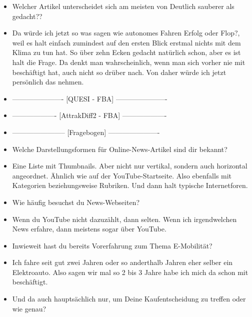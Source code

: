 {\begin{itemize}[]
              Deswegen würde ich da drauf gehen, auch wenn das jetzt eventuell vom Namen her eher das Gegenteil ist.
              Aber meiner Meinung nach hängt das natürlich trotzdem zusammen und würde mir halt sowohl auf positive als auch negative Art und Weise Informationen geben zu dem Thema.
              Der Artikel \flqq Von wegen nur das Klima retten\frqq{}.
        \item {} Welcher Artikel unterscheidet sich am meisten von \flqq Deutlich sauberer als gedacht?\frqq{}?
        \item {} Da würde ich jetzt so was sagen wie \flqq autonomes Fahren Erfolg oder Flop?\frqq{}, weil es halt einfach zumindest auf den ersten Blick erstmal nichts mit dem Klima zu tun hat.
              So über zehn Ecken gedacht natürlich schon, aber es ist halt die Frage.
              Da denkt man wahrscheinlich, wenn man sich vorher nie mit beschäftigt hat, auch nicht so drüber nach.
              Von daher würde ich jetzt persönlich das nehmen.
        \item {----------------------} [QUESI - FBA] {----------------------}
        \item {-------------------} [AttrakDiff2 - FBA] {-------------------}
        \item {-----------------------} [Fragebogen] {----------------------}
        \item {} Welche Darstellungsformen für Online-News-Artikel sind dir bekannt?
        \item {} Eine Liste mit Thumbnails.
              Aber nicht nur vertikal, sondern auch horizontal angeordnet.
              Ähnlich wie auf der YouTube-Startseite.
              Also ebenfalls mit Kategorien beziehungsweise Rubriken.
              Und dann halt typische Internetforen.
        \item {} Wie häufig besuchst du News-Webseiten?
        \item {} Wenn du YouTube nicht dazuzählt, dann selten.
              Wenn ich irgendwelchen News erfahre, dann meistens sogar über YouTube.
        \item {} Inwieweit hast du bereits Vorerfahrung zum Thema E-Mobilität?
        \item {} Ich fahre seit gut zwei Jahren oder so anderthalb Jahren eher selber ein Elektroauto.
              Also sagen wir mal so 2 bis 3 Jahre habe ich mich da schon mit beschäftigt.
        \item {} Und da auch hauptsächlich nur, um Deine Kaufentscheidung zu treffen oder wie genau?

\end{itemize}}
